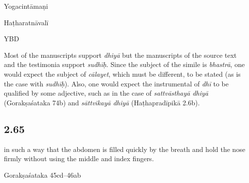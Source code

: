 \begin{ekdosis}
\begin{testimonia}[hp02_064]
Yogacintāmaṇi

\begin{versinnote}
\end{versinnote}

Haṭharatnāvalī

\begin{versinnote}
\end{versinnote}

YBD

\begin{versinnote}
\end{versinnote}
\end{testimonia}

\begin{philcomm}[hp02_064]
Most of the manuscripts support \emph{dhiyā} but the manuscripts of the source text and the testimonia support \emph{sudhīḥ}. Since the subject of the simile is \emph{bhastrā}, one would expect the subject of \emph{cālayet}, which must be different, to be stated (as is the case with \emph{sudhīḥ}). Also, one would expect the instrumental of \emph{dhī} to be qualified by some adjective, such as in the case of \emph{sattvāsthayā dhiyā} (Gorakṣaśataka 74b) and \emph{sāttvikayā dhiyā} (Haṭhapradīpikā 2.6b).
\end{philcomm}

\subsection*{2.65}
\begin{translation}[hp02_065]
in such a way that the abdomen is filled quickly by the breath and  hold the nose firmly without using the middle and index fingers.
\end{translation}

\begin{sources}[hp02_065]
Gorakṣaśataka 45cd–46ab


\end{sources}
\end{ekdosis}
